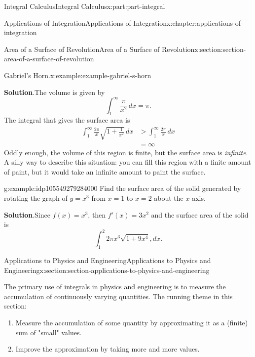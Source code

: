 \documentclass[twoside,10pt,]{book}
\newcommand{\blocktitlefont}{\relax}
\numberwithin{equation}{part}
\newcommand{\gt}{>}
\newcommand{\amp}{&}
\begin{document}
\begin{partptx}{Integral Calculus}{}{Integral Calculus}{}{}{x:part:part-integral}
\begin{chapterptx}{Applications of Integration}{}{Applications of Integration}{}{}{x:chapter:applications-of-integration}
\begin{sectionptx}{Area of a Surface of Revolution}{}{Area of a Surface of Revolution}{}{}{x:section:section-area-of-a-surface-of-revolution}
\begin{example}{Gabriel's Horn.}{x:example:example-gabriel-s-horn}
\par\smallskip%
\noindent\textbf{\blocktitlefont Solution}.\hypertarget{g:solution:idp105549279281952}{}\quad{}The volume is given by%
\begin{equation*}
\int_{1}^{\infty}\frac{\pi}{x^{2}}\,dx = \pi\text{.}
\end{equation*}
The integral that gives the surface area is%
%
\begin{align*}
\int_{1}^{\infty}\frac{2\pi}{x}\sqrt{1 + \frac{1}{x^{2}}}\,dx \amp \gt \int_{1}^{\infty}\frac{2\pi}{x}\,dx \\
\amp = \infty 
\end{align*}
Oddly enough, the volume of this region is finite, but the surface area is \emph{infinite}. A silly way to describe this situation: you can fill this region with a finite amount of paint, but it would take an infinite amount to paint the surface.%
\end{example}
\begin{example}{}{g:example:idp105549279284000}%
Find the surface area of the solid generated by rotating the graph of \(y=x^{3}\) from \(x=1\) to \(x=2\) about the \(x\)-axis.%
\par\smallskip%
\noindent\textbf{\blocktitlefont Solution}.\hypertarget{g:solution:idp105549279286048}{}\quad{}Since \(f(x)=x^{3}\), then \(f'(x)=3x^{2}\) and the surface area of the solid is%
\begin{equation*}
\int_{1}^{2}2\pi x^{3}\sqrt{1+9x^{4}},dx.
\end{equation*}
%
\end{example}
\end{sectionptx}
%
%
\typeout{************************************************}
\typeout{************************************************}
%
\begin{sectionptx}{Applications to Physics and Engineering}{}{Applications to Physics and Engineering}{}{}{x:section:section-applications-to-physics-and-engineering}
\begin{introduction}{}%
The primary use of integrals in physics and engineering is to measure the accumulation of continuously varying quantities. The running theme in this section:%
%
\begin{enumerate}
\item{}Measure the accumulation of some quantity by approximating it as a (finite) sum of "small" values.%
\item{}Improve the approximation by taking more and more values.%

\end{enumerate}
\end{introduction}
\end{sectionptx}
\end{chapterptx}
\end{partptx}
\end{document}
